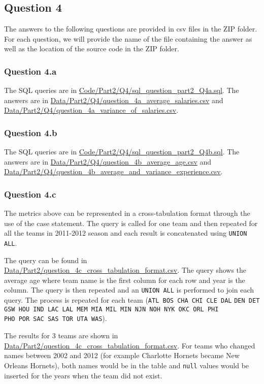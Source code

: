
\subsection{Question 4}
\label{subsec:414}

The answers to the following questions are provided in csv files in the ZIP folder. For each question, we will provide the name of the file containing the answer as well as the location of the source code in the ZIP folder.

\subsubsection{Question 4.a}
\label{subsubsec:414a}

The SQL queries are in \url{Code/Part2/Q4/sql_question_part2_Q4a.sql}. The answers are in \url{Data/Part2/Q4/question_4a_average_salaries.csv} and \url{Data/Part2/Q4/question_4a_variance_of_salaries.csv}.

\subsubsection{Question 4.b}
\label{subsubsec:414b}

The SQL queries are in \url{Code/Part2/Q4/sql_question_part2_Q4b.sql}. The answers are in \url{Data/Part2/Q4/question_4b_average_age.csv} and \url{Data/Part2/Q4/question_4b_average_and_variance_experience.csv}.

\subsubsection{Question 4.c}
\label{subsubsec:414c}

The metrics above can be represented in a cross-tabulation format through the use of the case statement. The query is called for one team and then repeated for all the teams in 2011-2012 season and each result is concatenated using \verb|UNION ALL|. 

The query can be found in \url{Data/Part2/question_4c_cross_tabulation_format.csv}.
The query shows the average age where team name is the first column for each row and year is the column. The query is then repeated and an \verb|UNION ALL| is performed to join each query. The process is repeated for each team (\verb|ATL BOS CHA CHI CLE DAL|  \verb|DEN DET GSW HOU IND LAC LAL MEM MIA MIL MIN NJN NOH NYK OKC ORL PHI| \\ \verb|PHO POR SAC SAS TOR UTA WAS|).

The results for 3 teams are shown in \url{Data/Part2/question_4c_cross_tabulation_format.csv}.  For teams who changed names between 2002 and 2012 (for example Charlotte Hornets became New Orleans Hornets), both names would be in the table and \verb|null| values would be inserted for the years when the team did not exist. 
